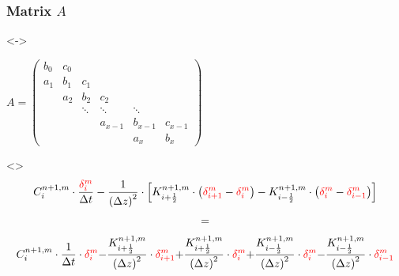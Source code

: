 \documentclass[xcolor=dvipsnames]{beamer}
\newcounter{firstElement}
\newcounter{secondElement}
\begin{document}
\begin{frame}[t]
  \frametitle{Matrix $A$}
  \only<\thefirstElement-\thesecondElement>{
    \centerline{
      \begin{math}
        A =
        \begin{pmatrix}
          b_0 & c_0 & & & & \\
          a_1 & b_1 & c_1 & & & \\
          & a_2 & b_2 & c_2 & & \\
          & & \ddots & \ddots & \ddots & \\
          & & & a_{x-1} & b_{x-1} & c_{x-1} \\
          & & & & a_x & b_x
        \end{pmatrix}
      \end{math}}}
  \only<\thesecondElement>{
    \begin{gather*}
      C_i^{n+1,m} \cdot \frac{\textcolor{red}{\delta_i^m}}{\Delta t} - \frac{1}{\left(\Delta z\right)^2} \cdot \left[K_{i+\frac{1}{2}}^{n+1,m} \cdot \left(\textcolor{red}{\delta_{i+1}^m} - \textcolor{red}{\delta_i^m}\right) - K_{i-\frac{1}{2}}^{n+1,m} \cdot \left(\textcolor{red}{\delta_i^m} - \textcolor{red}{\delta_{i-1}^m}\right)\right] \\[+1mm]
      = \\[+1mm]
      \textcolor{black}{C_i^{n+1,m} \cdot \frac{1}{\Delta t}} \cdot \textcolor{red}{\delta_i^m}
      \textcolor{black}{ - \frac{K_{i+\frac{1}{2}}^{n+1,m}}{\left(\Delta z\right)^2}} \cdot \textcolor{red}{\delta_{i+1}^m}
      \textcolor{black}{ + \frac{K_{i+\frac{1}{2}}^{n+1,m}}{\left(\Delta z\right)^2}} \cdot \textcolor{red}{\delta_i^m}
      \textcolor{black}{ + \frac{K_{i-\frac{1}{2}}^{n+1,m}}{\left(\Delta z\right)^2}} \cdot \textcolor{red}{\delta_i^m}
      \textcolor{black}{ - \frac{K_{i-\frac{1}{2}}^{n+1,m}}{\left(\Delta z\right)^2}} \cdot \textcolor{red}{\delta_{i-1}^m}
    \end{gather*}}


\end{frame}
\end{document}
